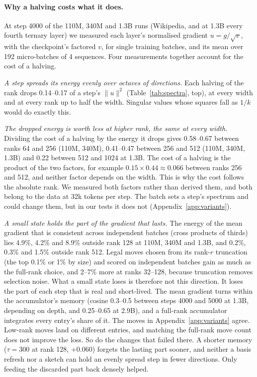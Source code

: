\documentclass[10pt,twocolumn]{article}
\begin{document}
\paragraph{Why a halving costs what it does.} At step 4000 of the 110M, 340M and 1.3B runs (Wikipedia, and at 1.3B every
fourth ternary layer) we measured each layer's normalised gradient $u=g/\sqrt v$, with the checkpoint's factored $v$, for
single training batches, and its mean over 192 micro-batches of 4 sequences. Four measurements together account for the
cost of a halving.

\emph{A step spreads its energy evenly over octaves of directions.} Each halving of the rank drops 0.14--0.17 of a
step's $\|u\|^2$ (Table~\ref{tab:spectra}, top), at every width and at every rank up to half the width. Singular values
whose squares fall as $1/k$ would do exactly this.

\emph{The dropped energy is worth less at higher rank, the same at every width.} Dividing the cost of a halving by the
energy it drops gives 0.58--0.67 between ranks 64 and 256 (110M, 340M), 0.41--0.47 between 256 and 512 (110M, 340M,
1.3B) and 0.22 between 512 and 1024 at 1.3B. The cost of a halving is the product of the two factors, for example
$0.15\times0.44\approx0.066$ between ranks 256 and 512, and neither factor depends on the width. This is why the cost
follows the absolute rank. We measured both factors rather than derived them, and both belong to the data at 32k tokens
per step. The batch sets a step's spectrum and could change them, but in our tests it does not
(Appendix~\ref{app:variants}).

\emph{A small state holds the part of the gradient that lasts.} The energy of the mean gradient that is consistent
across independent batches (cross products of thirds) lies 4.9\%, 4.2\% and 8.9\% outside rank 128 at 110M, 340M and
1.3B, and 0.2\%, 0.3\% and 1.5\% outside rank 512. Legal moves chosen from its rank-$r$ truncation (the top 0.1\% or 1\%
by size) and scored on independent batches gain as much as the full-rank choice, and 2--7\% more at ranks 32--128,
because truncation removes selection noise. What a small state loses is therefore not this direction. It loses the part
of each step that is real and short-lived. The mean gradient turns within the accumulator's memory (cosine 0.3--0.5
between steps 4000 and 5000 at 1.3B, depending on depth, and 0.25--0.65 at 2.9B), and a full-rank accumulator integrates
every entry's share of it. The moves in Appendix~\ref{app:variants} agree. Low-rank moves land on different entries, and
matching the full-rank move count does not improve the loss. So do the changes that failed there. A shorter memory ($\tau=300$ at
rank 128, $+0.060$) forgets the lasting part sooner, and neither a basis refresh nor a sketch can hold an evenly spread
step in fewer directions. Only feeding the discarded part back densely helped.
\end{document}
